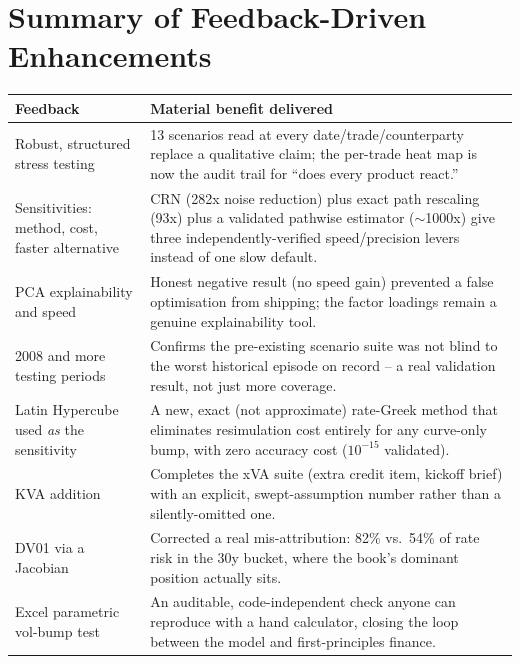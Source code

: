 \documentclass[10pt,letterpaper]{article}
\begin{document}
\section{Summary of Feedback-Driven Enhancements}
\begin{center}\small
\begin{tabular}{p{}p{}}
\toprule
\textbf{Feedback} & \textbf{Material benefit delivered} \\
\midrule
Robust, structured stress testing & 13 scenarios read at every date/trade/counterparty replace a qualitative claim; the per-trade heat map is now the audit trail for ``does every product react.'' \\
Sensitivities: method, cost, faster alternative & CRN (282x noise reduction) plus exact path rescaling (93x) plus a validated pathwise estimator ($\sim$1000x) give three independently-verified speed/precision levers instead of one slow default. \\
PCA explainability and speed & Honest negative result (no speed gain) prevented a false optimisation from shipping; the factor loadings remain a genuine explainability tool. \\
2008 and more testing periods & Confirms the pre-existing scenario suite was not blind to the worst historical episode on record -- a real validation result, not just more coverage. \\
Latin Hypercube used \emph{as} the sensitivity & A new, exact (not approximate) rate-Greek method that eliminates resimulation cost entirely for any curve-only bump, with zero accuracy cost ($10^{-15}$ validated). \\
KVA addition & Completes the xVA suite (extra credit item, kickoff brief) with an explicit, swept-assumption number rather than a silently-omitted one. \\
DV01 via a Jacobian & Corrected a real mis-attribution: 82\% vs.\ 54\% of rate risk in the 30y bucket, where the book's dominant position actually sits. \\
Excel parametric vol-bump test & An auditable, code-independent check anyone can reproduce with a hand calculator, closing the loop between the model and first-principles finance. \\
\bottomrule
\end{tabular}
\end{center}
\end{document}
